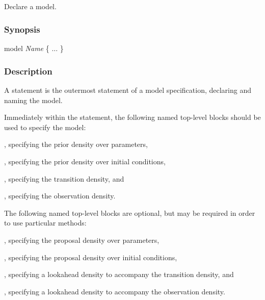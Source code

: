 \subsection{\label{model}}

Declare a model.

\subsubsection*{Synopsis\label{model_Synopsis}}
\begin{bicode}
    model \textsl{Name} \{
      \(\ldots\)
    \}
\end{bicode}

\subsubsection*{Description\label{model_Description}}

A  statement is the outermost statement of a model specification,
declaring and naming the model.

Immediately within the  statement, the following named top-level blocks should
be used to specify the model:
\begin{description}
\item {}, specifying the prior density over parameters,
\item {}, specifying the prior density over initial conditions,
\item {}, specifying the transition density, and
\item {}, specifying the observation density.
\end{description}

The following named top-level blocks are optional, but may be required in order to use particular methods:
\begin{description}
\item {}, specifying the proposal density over parameters,
\item {}, specifying the proposal density over initial conditions,
\item {}, specifying a lookahead density to accompany the transition density, and
\item {}, specifying a lookahead density to accompany the observation density.
\end{description}

